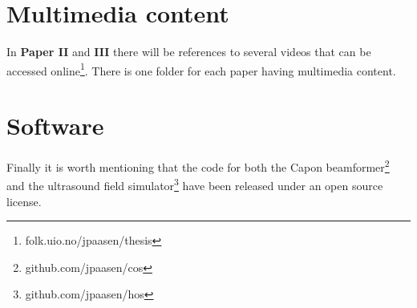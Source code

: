 \section{Multimedia content}
In \textbf{Paper II} and \textbf{III} there will be references to several videos that can be accessed online\footnote{folk.uio.no/jpaasen/thesis}. There is one folder for each paper having multimedia content.

\section{Software}
Finally it is worth mentioning that the code for both the Capon beamformer\footnote{github.com/jpaasen/cos} and the ultrasound field simulator\footnote{github.com/jpaasen/hos} have been released under an open source license. 

\endinput